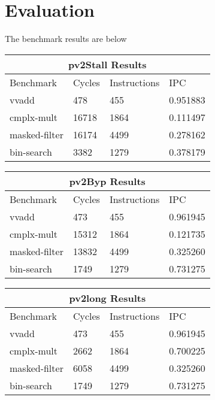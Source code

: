 \documentclass[a4paper, 12pt]{article}
\begin{document}
\section{Evaluation}
The benchmark results are below

\begin{center}
\begin{tabular}{ |p{3cm}|p{3cm}|p{3cm}|p{4.5cm}|  }
 \hline
 \multicolumn{4}{|c|}{pv2Stall Results} \\
 \hline
 Benchmark & Cycles & Instructions & IPC  \\
 \hline
 vvadd & 478 & 455 & 0.951883 \\
 cmplx-mult & 16718 & 1864 & 0.111497 \\
 masked-filter & 16174 & 4499 & 0.278162 \\
 bin-search & 3382 & 1279 & 0.378179 \\
 \hline
\end{tabular}
\end{center}

\begin{center}
\begin{tabular}{ |p{3cm}|p{3cm}|p{3cm}|p{4.5cm}|  }
 \hline
 \multicolumn{4}{|c|}{pv2Byp Results} \\
 \hline
 Benchmark & Cycles & Instructions & IPC  \\
 \hline
 vvadd & 473 & 455 & 0.961945 \\
 cmplx-mult & 15312 & 1864 & 0.121735 \\
 masked-filter & 13832 & 4499 & 0.325260 \\
 bin-search & 1749 & 1279 & 0.731275 \\
 \hline
\end{tabular}
\end{center}


\begin{center}
\begin{tabular}{ |p{3cm}|p{3cm}|p{3cm}|p{4.5cm}|  }
 \hline
 \multicolumn{4}{|c|}{pv2long Results} \\
 \hline
 Benchmark & Cycles & Instructions & IPC  \\
 \hline
 vvadd & 473 & 455 & 0.961945 \\
 cmplx-mult & 2662 & 1864 & 0.700225 \\
 masked-filter & 6058 & 4499 & 0.325260 \\
 bin-search & 1749 & 1279 & 0.731275 \\
 \hline
\end{tabular}
\end{center}
\end{document}
